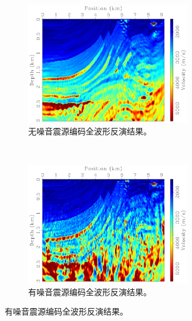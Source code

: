\documentclass[degree=doctor]{thuthesis}
\begin{document}
\begin{figure}[ht]
    \begin{subfigure}[b]{0.5\textwidth}
        \centering
        \includegraphics[height=2.1in]{esfwi.pdf}
        \caption{无噪音震源编码全波形反演结果。}
        \label{fig:无噪音震源编码全波形反演结果}
    \end{subfigure}%
    ~
    \begin{subfigure}[b]{0.5\textwidth}
        \centering
        \includegraphics[height=2.1in]{esfwi-noise.pdf}
        \caption{有噪音震源编码全波形反演结果。}
        \label{fig:有噪音震源编码全波形反演结果}
    \end{subfigure}
\end{figure}
\end{document}
